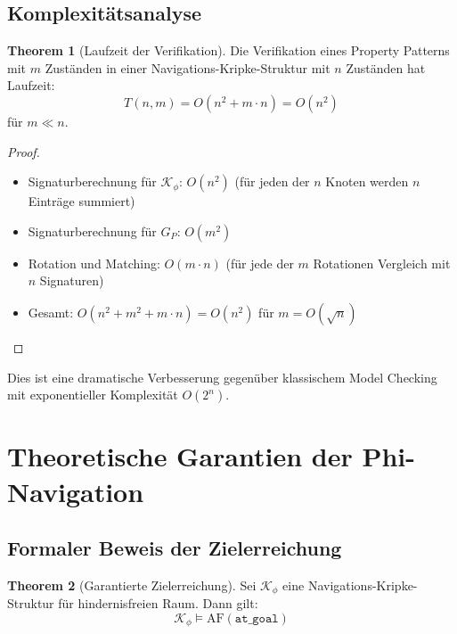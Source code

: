 ﻿\documentclass[a4paper,12pt]{article}
\theoremstyle{definition}
\newtheorem{theorem}{Theorem}[section]
\begin{document}
\subsection{Komplexitätsanalyse}

\begin{theorem}[Laufzeit der Verifikation]
Die Verifikation eines Property Patterns mit $m$ Zuständen in einer Navigations-Kripke-Struktur mit $n$ Zuständen hat Laufzeit:
\[
T(n,m) = O(n^2 + m \cdot n) = O(n^2)
\]
für $m \ll n$.
\end{theorem}

\begin{proof}
\begin{itemize}
	\item Signaturberechnung für $\mathcal{K}_{\phi}$: $O(n^2)$ (für jeden der $n$ Knoten werden $n$ Einträge summiert)
	\item Signaturberechnung für $G_P$: $O(m^2)$
	\item Rotation und Matching: $O(m \cdot n)$ (für jede der $m$ Rotationen Vergleich mit $n$ Signaturen)
	\item Gesamt: $O(n^2 + m^2 + m \cdot n) = O(n^2)$ für $m = O(\sqrt{n})$
\end{itemize}
\end{proof}

Dies ist eine dramatische Verbesserung gegenüber klassischem Model Checking mit exponentieller Komplexität $O(2^n)$.

\section{Theoretische Garantien der Phi-Navigation}

\subsection{Formaler Beweis der Zielerreichung}

\begin{theorem}[Garantierte Zielerreichung]
Sei $\mathcal{K}_{\phi}$ eine Navigations-Kripke-Struktur für hindernisfreien Raum. Dann gilt:
\[
\mathcal{K}_{\phi} \models \text{AF}(\texttt{at\_goal})
\]
\end{theorem}
\end{document}
